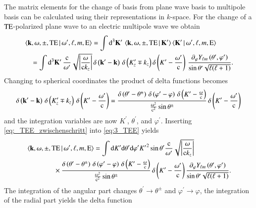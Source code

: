 The matrix elements for the change of basis from plane wave basis to multipole
basis can be calculated using their representations in $k$-space. For the
change of a $\mathrm{TE}$-polarized plane wave to an electric multipole wave we obtain
\begin{align}
\nonumber
&\braket{{\mathbf{k}},\omega,\pm,\mathrm{TE} \, |\, \omega^\prime,\ell,m,\text{E}} = \int \mathrm{d}^3{\mathbf{K}}^\prime \, \braket{{\mathbf{k}},\omega,\pm,\mathrm{TE} \, |\, {\mathbf{K}}^\prime} \braket{{\mathbf{K}}^\prime \, | \, \omega^\prime,\ell,m,\text{E}} \\
\label{eq:3_TEE}
&\quad = \int \mathrm{d}^3{\mathbf{K}}^\prime \, \frac{\mathrm{c}}{\omega^\prime} \sqrt{\left| \frac{\omega}{\mathrm{c} k_z} \right|} \, \delta\left({\mathbf{k}}^\prime - {\mathbf{k}}\right) \, \delta\left(K_z^\prime \mp k_z\right) \delta\left(K^\prime-\frac{\omega^\prime}{\mathrm{c}}\right) \, \frac{\partial_\varphi Y_{\ell m}\left(\theta^\prime,\varphi^\prime\right)}{\sin\theta^\prime \sqrt{\ell(\ell+1)}}.
\end{align}
Changing to spherical coordinates the product of delta functions becomes
\begin{equation}
\label{eq:_TEE_zwischenschritt}
\delta\left({\mathbf{k}}^\prime - {\mathbf{k}}\right) \, \delta\left(K_z^\prime \mp k_z\right) \, \delta\left(K^\prime-\frac{\omega^\prime}{\mathrm{c}}\right) =
\frac{\delta\left(\theta^\prime-\theta^\pm\right) \, \delta\left(\varphi^\prime-\varphi\right) \, \delta\left(K^\prime-\frac{\omega}{\mathrm{c}}\right)}{\frac{\omega^2}{\mathrm{c}^2} \sin\theta^\pm} \, \delta\left(K^\prime-\frac{\omega^\prime}{\mathrm{c}}\right)
\end{equation}
and the integration variables are now $K^\prime$, $\theta^\prime$, and $\varphi^\prime$.
Inserting \eqref{eq:_TEE_zwischenschritt} into \eqref{eq:3_TEE} yields
\begin{align}
&\braket{{\mathbf{k}},\omega,\pm,\mathrm{TE} \, |\, \omega^\prime,\ell,m,\text{E}} = \int \mathrm{d}K^\prime \mathrm{d}\theta^\prime \mathrm{d}\varphi^\prime {K^\prime}^2 \sin\theta^\prime \frac{\mathrm{c}}{\omega^\prime} \sqrt{\left| \frac{\omega}{\mathrm{c} k_z} \right|} \\
&\quad\quad\quad\quad\times \frac{\delta\left(\theta^\prime-\theta^\pm\right) \, \delta\left(\varphi^\prime-\varphi\right) \, \delta\left(K^\prime-\frac{\omega}{\mathrm{c}}\right)}{\frac{\omega^2}{\mathrm{c}^2} \sin\theta^\pm} \, \delta\left(K^\prime-\frac{\omega^\prime}{\mathrm{c}}\right) \frac{\partial_\varphi Y_{\ell m}\left(\theta^\prime,\varphi^\prime\right)}{\sin\theta^\prime \sqrt{\ell(\ell+1)}}.
\end{align}
The integration of the angular part changes $\theta^\prime\to\theta^\pm$ and 
$\varphi^\prime\to\varphi$, the integration of the radial part yields the delta function
